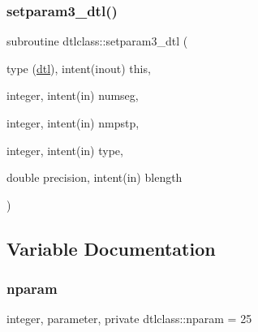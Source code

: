 \mbox{\label{namespacedtlclass_aaccb0362c1862fd4f4e34a23f1bb25b9}} 
\subsubsection{\texorpdfstring{setparam3\_dtl()}{setparam3\_dtl()}}
{\footnotesize\ttfamily subroutine dtlclass\+::setparam3\+\_\+dtl (\begin{DoxyParamCaption}\item[{type (\mbox{\hyperlink{namespacedtlclass_structdtlclass_1_1dtl}{dtl}}), intent(inout)}]{this,  }\item[{integer, intent(in)}]{numseg,  }\item[{integer, intent(in)}]{nmpstp,  }\item[{integer, intent(in)}]{type,  }\item[{double precision, intent(in)}]{blength }\end{DoxyParamCaption})}



\subsection{Variable Documentation}
\mbox{\label{namespacedtlclass_adf04761c96168c3dc492c89c72194cea}} 
\subsubsection{\texorpdfstring{nparam}{nparam}}
{\footnotesize\ttfamily integer, parameter, private dtlclass\+::nparam = 25\hspace{0.3cm}{\ttfamily [private]}}


